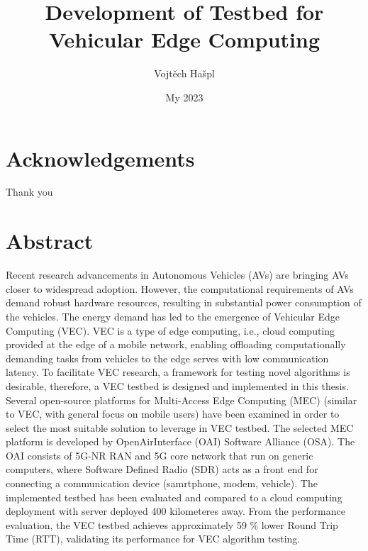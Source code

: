 \documentclass[12pt,a4paper,twoside]{report}
\title {Development of Testbed for Vehicular Edge Computing}
\author{Vojtěch Hašpl}
\date{My 2023}
\begin{document}
\maketitle




\makestatement




\chapter*{Acknowledgements}
	Thank you


\chapter*{Abstract}
Recent research advancements in Autonomous Vehicles (AVs) are bringing AVs closer to widespread adoption. However, the computational requirements of AVs demand robust hardware resources, resulting in substantial power consumption of the vehicles. The energy demand has led to the emergence of Vehicular Edge Computing (VEC). VEC is a type of edge computing, i.e., cloud computing provided at the edge of a mobile network, enabling offloading computationally demanding tasks from vehicles to the edge serves with low communication latency. To facilitate VEC research, a framework for testing novel algorithms is desirable, therefore, a VEC testbed is designed and implemented in this thesis. Several open-source platforms for Multi-Access Edge Computing (MEC) (similar to VEC, with general focus on mobile users) have been examined in order to select the most suitable solution to leverage in VEC testbed. The selected MEC platform is developed by OpenAirInterface (OAI) Software Alliance (OSA). The OAI consists of 5G-NR RAN and 5G core network that run on generic computers, where Software Defined Radio (SDR) acts as a front end for connecting a communication device (samrtphone, modem, vehicle). The implemented testbed has been evaluated and compared to a cloud computing deployment with  server deployed 400 kilometeres away. From the performance evaluation, the VEC testbed achieves approximately 59 \% lower Round Trip Time (RTT), validating its performance for VEC algorithm testing.
	
\end{document}
